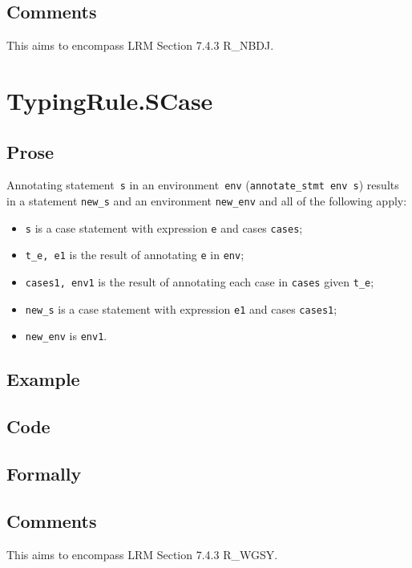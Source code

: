 \documentclass{book}
\begin{document}
\subsection{Comments}
    This aims to encompass LRM Section 7.4.3 R\_NBDJ.

\section{TypingRule.SCase \label{sec:TypingRule.SCase}}

  \subsection{Prose}
Annotating statement~\texttt{s} in an environment~\texttt{env}
(\texttt{annotate\_stmt env s}) results in a statement \texttt{new\_s} and an
environment \texttt{new\_env} and all of the following apply:
   \begin{itemize}
   \item \texttt{s} is a case statement with expression \texttt{e} and cases \texttt{cases};
   \item \texttt{t\_e, e1} is the result of annotating \texttt{e} in \texttt{env};
   \item \texttt{cases1, env1} is the result of annotating each case in \texttt{cases} given \texttt{t\_e};
   \item \texttt{new\_s} is a case statement with expression \texttt{e1} and cases \texttt{cases1};
   \item \texttt{new\_env} is \texttt{env1}.
   \end{itemize}

  \subsection{Example}

  \subsection{Code}

\begin{emptyformal}
    \subsection{Formally}
\end{emptyformal}

\subsection{Comments}
    This aims to encompass LRM Section 7.4.3 R\_WGSY.
  
\end{document}

